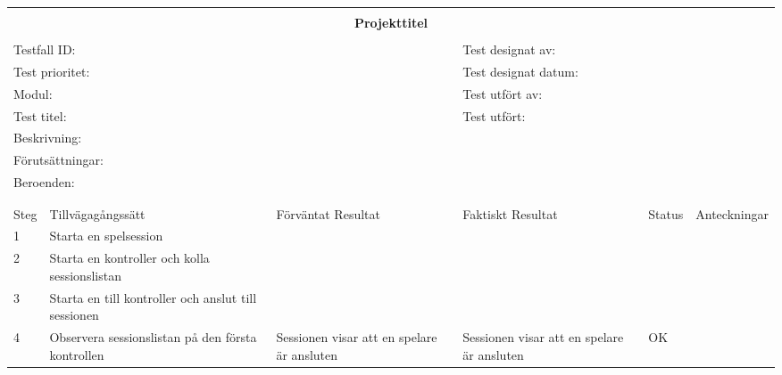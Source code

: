 \documentclass[10pt]{article}
\begin{document}
\begin{tabular}{| p{1cm}|  p{3cm} | p{3cm}| p{3cm}| p{2cm}| p{3cm}|}


	\hline
	\multicolumn{6}{|l|}{}\\
	\multicolumn{6}{|c|}{\huge{\textbf{Projekttitel}}}\\
	\multicolumn{6}{|l|}{}\\
	\hline
	\multicolumn{3}{|l|}{Testfall ID:}&\multicolumn{3}{|l|}{Test designat av:}\\
	\hline
	\multicolumn{3}{|l|}{Test prioritet:}&\multicolumn{3}{|l|}{Test designat datum:}\\
	\hline
	\multicolumn{3}{|l|}{Modul:}&\multicolumn{3}{|l|}{Test utfört av:}\\
	\hline
	\multicolumn{3}{|l|}{Test titel:}&\multicolumn{3}{|l|}{Test utfört:}\\
	\hline
	\multicolumn{3}{|l|}{Beskrivning:}&\multicolumn{3}{|l|}{}\\
	\hline
	\multicolumn{6}{|l|}{Förutsättningar:}\\
	\hline
	\multicolumn{6}{|l|}{Beroenden:}\\
	
	\hline
	\multicolumn{6}{|l|}{}\\
	\multicolumn{6}{|l|}{}\\
      	\hline
	Steg&Tillvägagångssätt&Förväntat Resultat&Faktiskt Resultat&Status&Anteckningar \\
	\hline
	1&Starta en spelsession&&&&\\
      	\hline
	2&Starta en kontroller och kolla sessionslistan&&&&\\
      	\hline
	3&Starta en till kontroller och anslut till sessionen&&&&\\
      	\hline
	4&Observera sessionslistan på den första kontrollen&Sessionen visar att en spelare är ansluten&Sessionen visar att en spelare är ansluten&OK&\\
      	\hline


	\end{tabular}
\end{document}
